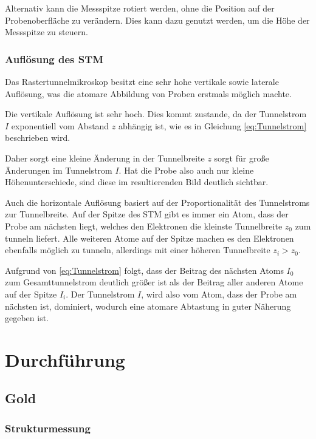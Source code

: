 \documentclass[12pt,a4paper]{scrartcl}
\numberwithin{equation}{section} %
\begin{document}
Alternativ kann die Messspitze rotiert werden, ohne die Position auf der Probenoberfläche zu verändern. Dies kann dazu genutzt werden, um die Höhe der Messspitze zu steuern.

\hypertarget{auflösung}{
\subsubsection{Auflösung des STM}\label{auflösung}}
Das Rastertunnelmikroskop besitzt eine sehr hohe vertikale sowie laterale Auflösung, was die atomare Abbildung von Proben erstmals möglich machte.

Die vertikale Auflösung ist sehr hoch. Dies kommt zustande, da der Tunnelstrom $I$ exponentiell vom Abstand $z$ abhängig ist, wie es in Gleichung \eqref{eq:Tunnelstrom} beschrieben wird.

Daher sorgt eine kleine Änderung in der Tunnelbreite $z$ sorgt  für große Änderungen im Tunnelstrom $I$. Hat die Probe also auch nur kleine Höhenunterschiede, sind diese im resultierenden Bild deutlich sichtbar.

Auch die horizontale Auflösung basiert auf der Proportionalität des Tunnelstroms zur Tunnelbreite. Auf der Spitze des STM gibt es immer ein Atom, dass der Probe am nächsten liegt, welches den Elektronen die kleinste Tunnelbreite $z_0$ zum tunneln liefert. Alle weiteren Atome auf der Spitze machen es den Elektronen ebenfalls möglich zu tunneln, allerdings mit einer höheren Tunnelbreite $z_i > z_0$.

Aufgrund von \eqref{eq:Tunnelstrom} folgt, dass der Beitrag des nächsten Atoms $I_0$ zum Gesamttunnelstrom deutlich größer ist als der Beitrag aller anderen Atome auf der Spitze $I_i$. Der Tunnelstrom $I$, wird also vom Atom, dass der Probe am nächsten ist, dominiert, wodurch eine atomare Abtastung in guter Näherung gegeben ist.

\clearpage
\hypertarget{durchfuxfchrung}{%
\section{Durchführung}\label{durchfuxfchrung}}

\hypertarget{gold}{%
\subsection{Gold}\label{gold}}

\hypertarget{strukturmessung}{%
\subsubsection{Strukturmessung}\label{strukturmessung}}
\end{document}
